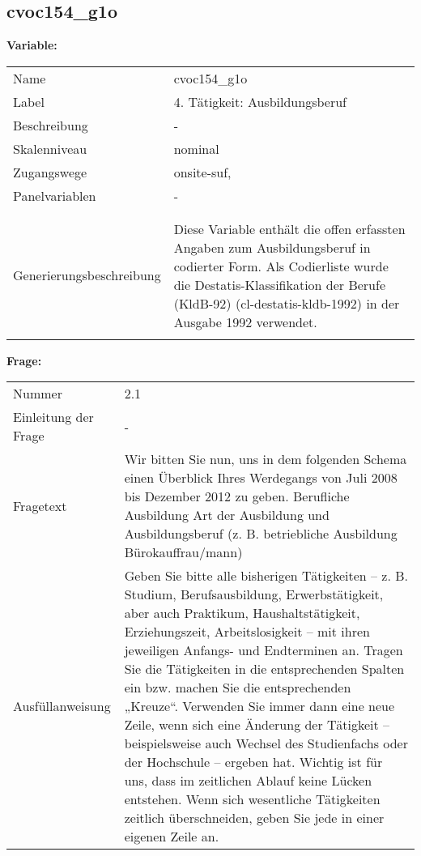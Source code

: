 	
	
	\subsection{cvoc154\_g1o}
	\label{subSection:cvoc154_g1o}

	\noindent\textbf{Variable:}\\
		\begin{tabular}{lL{11.3cm}}
			\label{tableVariable:cvoc154_g1o}
			Name & cvoc154\_g1o \\
			Label & 4. Tätigkeit: Ausbildungsberuf \\
			Beschreibung & - \\
			Skalenniveau & nominal \\
			Zugangswege &
				onsite-suf,
 \\
			Panelvariablen & -
			 \\
			 \\
 \\
					Generierungsbeschreibung & Diese Variable enthält die offen erfassten Angaben zum Ausbildungsberuf in codierter Form. Als Codierliste wurde die Destatis-Klassifikation der Berufe (KldB-92) (cl-destatis-kldb-1992) in der Ausgabe 1992 verwendet. 
				 \\	
			 \\
		\end{tabular}

		\vspace*{1 cm}
		\noindent\textbf{Frage:}\\
		\begin{tabular}{lL{11.3cm}}
			\label{tableQuestion:cvoc154_g1o}
			Nummer & 2.1 \\
			Einleitung der Frage & - \\
			Fragetext & Wir bitten Sie nun, uns in dem folgenden Schema einen Überblick Ihres Werdegangs von Juli 2008 bis Dezember 2012 zu geben.
Berufliche Ausbildung
Art der Ausbildung und Ausbildungsberuf
(z. B. betriebliche Ausbildung Bürokauffrau/mann) \\
			Ausfüllanweisung & Geben Sie bitte alle bisherigen Tätigkeiten – z. B. Studium, Berufsausbildung, Erwerbstätigkeit, aber auch Praktikum, Haushaltstätigkeit,
Erziehungszeit, Arbeitslosigkeit – mit ihren jeweiligen Anfangs- und Endterminen an. Tragen Sie die Tätigkeiten in die entsprechenden Spalten ein bzw. machen Sie die entsprechenden „Kreuze“. Verwenden Sie immer dann eine neue Zeile, wenn sich eine Änderung der Tätigkeit – beispielsweise auch Wechsel des Studienfachs oder der Hochschule – ergeben hat. Wichtig ist für uns, dass im zeitlichen Ablauf keine Lücken entstehen. Wenn sich wesentliche Tätigkeiten zeitlich überschneiden, geben Sie jede in einer eigenen Zeile an. \\
		\end{tabular}





